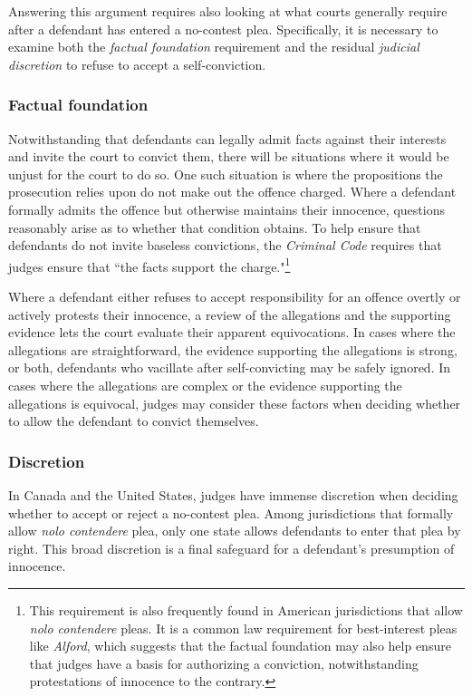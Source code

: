 Answering this argument requires also looking at what courts generally require after a defendant has entered a no-contest plea. Specifically, it is necessary to examine both the \textit{factual foundation} requirement and the residual \textit{judicial discretion} to refuse to accept a self-conviction.

\subsubsection{Factual foundation}

Notwithstanding that defendants can legally admit facts against their interests and invite the court to convict them, there will be situations where it would be unjust for the court to do so. One such situation is where the propositions the prosecution relies upon do not make out the offence charged. Where a defendant formally admits the offence but otherwise maintains their innocence, questions reasonably arise as to whether that condition obtains. To help ensure that defendants do not invite baseless convictions, the \textit{Criminal Code} requires that judges ensure that ``the facts support the charge."\footnote{This requirement is also frequently found in American jurisdictions that allow \textit{nolo contendere} pleas. It is a common law requirement for best-interest pleas like \textit{Alford}, which suggests that the factual foundation may also help ensure that judges have a basis for authorizing a conviction, notwithstanding protestations of innocence to the contrary.}

Where a defendant either refuses to accept responsibility for an offence overtly or actively protests their innocence, a review of the allegations and the supporting evidence lets the court evaluate their apparent equivocations. In cases where the allegations are straightforward, the evidence supporting the allegations is strong, or both, defendants who vacillate after self-convicting may be safely ignored. In cases where the allegations are complex or the evidence supporting the allegations is equivocal, judges may consider these factors when deciding whether to allow the defendant to convict themselves.

\subsubsection{Discretion}

In Canada and the United States, judges have immense discretion when deciding whether to accept or reject a no-contest plea. Among jurisdictions that formally allow \textit{nolo contendere} plea, only one state allows defendants to enter that plea by right. This broad discretion is a final safeguard for a defendant's presumption of innocence.

